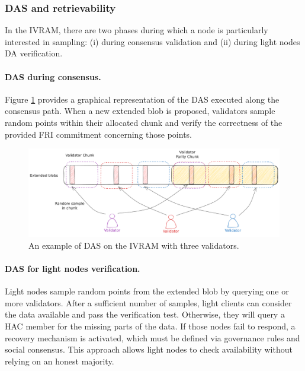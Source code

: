 \documentclass[11pt]{article}
\begin{document}
\subsubsection{DAS and retrievability}
In the IVRAM, there are two phases during which a node is particularly interested in sampling: (i) during consensus validation and (ii) during light nodes DA verification.

\paragraph{DAS during consensus.} Figure \ref{fig:yoda-das} provides a graphical representation of the DAS executed along the consensus path. When a new extended blob is proposed, validators sample random points within their allocated chunk and verify the correctness of the provided FRI commitment concerning those points.

\begin{figure}[htp]
    \centering
    \includegraphics[scale=0.2]{das-ivram.pdf}
    \caption{An example of DAS on the IVRAM with three validators.}
    \label{fig:yoda-das}
\end{figure}

\paragraph{DAS for light nodes verification.} Light nodes sample random points from the extended blob by querying one or more validators. After a sufficient number of samples, light clients can consider the data available and pass the verification test. Otherwise, they will query a HAC member for the missing parts of the data. If those nodes fail to respond, a recovery mechanism is activated, which must be defined via governance rules and social consensus. This approach allows light nodes to check availability without relying on an honest majority.
\end{document}
